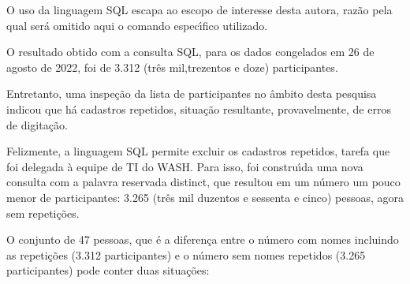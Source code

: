 \documentclass[
12pt,		%
openright,	%
twoside,  %
a4paper,			%
chapter=TITLE,		%
english,			%
french,				%
spanish,			%
brazil				%
]{USPSC-classe/USPSC}
\begin{document}
O uso da linguagem SQL escapa ao escopo de interesse desta autora, raz\~ao pela qual ser\'a omitido aqui o comando espec\'{\i}fico utilizado.

















O resultado obtido com a consulta SQL, para os dados congelados em 26 de agosto de 2022, foi de 3.312 (tr\^es mil,trezentos e doze) participantes.

















Entretanto, uma inspe\c{c}\~ao da lista de participantes no \^ambito desta pesquisa indicou que h\'a cadastros repetidos, situa\c{c}\~ao resultante, provavelmente, de erros de digita\c{c}\~ao.

















Felizmente, a linguagem SQL permite excluir os cadastros repetidos, tarefa que foi delegada \`a equipe de TI do WASH. Para isso, foi constru\'{\i}da uma nova consulta com a palavra reservada \textquotedbl distinct\textquotedbl , que resultou em um n\'umero um pouco menor de participantes: 3.265 (tr\^es mil duzentos e sessenta e cinco) pessoas, agora sem repeti\c{c}\~oes.

















O conjunto de 47 pessoas, que \'e a diferen\c{c}a entre o n\'umero com nomes incluindo as repeti\c{c}\~oes (3.312 participantes) e o n\'umero sem nomes repetidos (3.265 participantes) pode conter duas situa\c{c}\~oes:
\end{document}
